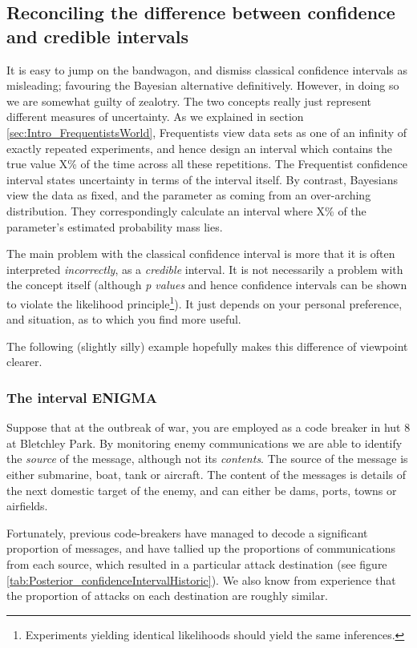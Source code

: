 \documentclass[11pt,fullpage]{book}
\begin{document}
\subsection{Reconciling the difference between confidence and credible intervals}
It is easy to jump on the bandwagon, and dismiss classical confidence intervals as misleading; favouring the Bayesian alternative definitively. However, in doing so we are somewhat guilty of zealotry. The two concepts really just represent different measures of uncertainty. As we explained in section \ref{sec:Intro_FrequentistsWorld}, Frequentists view data sets as one of an infinity of exactly repeated experiments, and hence design an interval which contains the true value X\% of the time across all these repetitions. The Frequentist confidence interval states uncertainty in terms of the interval itself. By contrast, Bayesians view the data as fixed, and the parameter as coming from an over-arching distribution. They correspondingly calculate an interval where X\% of the parameter's estimated probability mass lies.

The main problem with the classical confidence interval is more that it is often interpreted \textit{incorrectly}, as a \textit{credible} interval. It is not necessarily a problem with the concept itself (although \textit{p values} and hence confidence intervals can be shown to violate the likelihood principle\footnote{Experiments yielding identical likelihoods should yield the same inferences.}). It just depends on your personal preference, and situation, as to which you find more useful.

The following (slightly silly) example hopefully makes this difference of viewpoint clearer. 

\subsubsection{The interval ENIGMA}
Suppose that at the outbreak of war, you are employed as a code breaker in hut 8 at Bletchley Park. By monitoring enemy communications we are able to identify the \textit{source} of the message, although not its \textit{contents}. The source of the message is either submarine, boat, tank or aircraft. The content of the messages is details of the next domestic target of the enemy, and can either be dams, ports, towns or airfields.

Fortunately, previous code-breakers have managed to decode a significant proportion of messages, and have tallied up the proportions of communications from each source, which resulted in a particular attack destination (see figure \ref{tab:Posterior_confidenceIntervalHistoric}). We also know from experience that the proportion of attacks on each destination are roughly similar.
\end{document}
